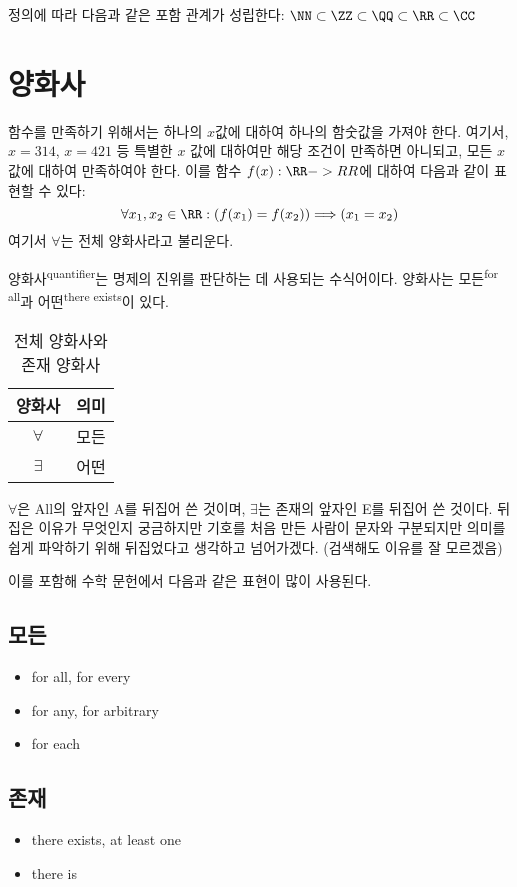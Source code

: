 \documentclass[../note.tex]{subfiles}
\begin{document}
정의에 따라 다음과 같은 포함 관계가 성립한다: $\NN \subset \ZZ \subset \QQ \subset \RR \subset \CC$

\section{양화사}
함수를 만족하기 위해서는 하나의 $x$값에 대하여 하나의 함숫값을 가져야 한다. 여기서, $x = 314$, $x = 421$ 등 특별한 $x$ 값에 대하여만 해당 조건이 만족하면 아니되고, 모든 $x$ 값에 대하여 만족하여야 한다. 이를 함수 $f(x):\RR->RR$에 대하여 다음과 같이 표현할 수 있다:
\begin{equation}
  \forall x_1, x_2 \in \RR : \left( f(x_1) = f(x_2) \right) \Longrightarrow \left( x_1 = x_2 \right)
\end{equation}
여기서 $\forall$는 전체 양화사라고 불리운다.

\begin{definition}[양화사]
  양화사\textsuperscript{quantifier}는 명제의 진위를 판단하는 데 사용되는 수식어이다. 양화사는 모든\textsuperscript{for all}과 어떤\textsuperscript{there exists}이 있다.
  \begin{table}[H]
    \centering
    \begin{tabular}{ c c }
      양화사 & 의미 \\
      \hline
      $\forall$\index{전체 양화사} & 모든 \\
      $\exists$\index{존재 양화사} & 어떤 \\
    \end{tabular}
    \caption{전체 양화사와 존재 양화사}
  \end{table}
\end{definition}

$\forall$은 All의 앞자인 A를 뒤집어 쓴 것이며, $\exists$는 존재의 앞자인 E를 뒤집어 쓴 것이다. 뒤집은 이유가 무엇인지 궁금하지만 기호를 처음 만든 사람이 문자와 구분되지만 의미를 쉽게 파악하기 위해 뒤집었다고 생각하고 넘어가겠다. (검색해도 이유를 잘 모르겠음)

이를 포함해 수학 문헌에서 다음과 같은 표현이 많이 사용된다.

\subsection{모든}
\begin{itemize}
  \item
    for all, for every
  \item
    for any, for arbitrary
  \item
    for each
\end{itemize}
\subsection{존재}
\begin{itemize}
  \item
    there exists, at least one
  \item
    there is
\end{itemize}

\toctrue



\tocfalse
\end{document}
